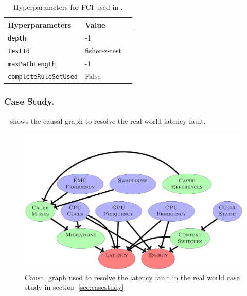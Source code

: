 \begin{table}[]
\centering
\caption{Hyperparameters for FCI used in \ourapproach.}
\begin{tabular}{lll}
\hline
Hyperparameters & Value \\
\hline 
\texttt{depth} &-1 \\
\texttt{testId} &fisher-z-test\\
\texttt{maxPathLength} &-1 \\
\texttt{completeRuleSetUsed}&False\\
\hline 

\end{tabular}
\end{table}
% 




\subsubsection{Case Study.}
~ shows the causal graph to resolve the real-world latency fault.

\begin{figure}[t!]
\small
    \centering
    \includegraphics*[width=\linewidth]{figures-vg/fig__realworld.pdf}
    \caption{\small {Causal graph used to resolve the latency fault in the real world case study in section~\ref{sec:casestudy}}}
    \label{fig:real_wrold_cpm}
    
\end{figure}

